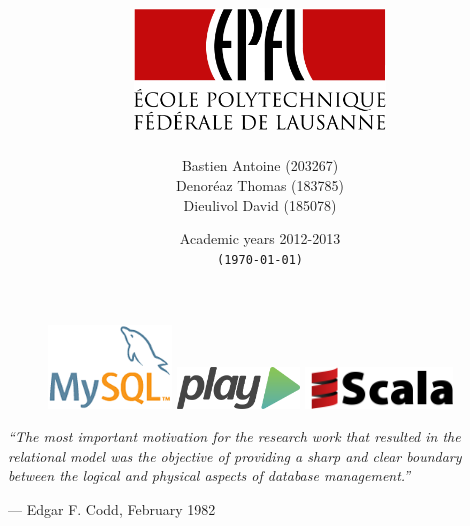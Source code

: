 \documentclass[a4paper,oneside,11pt]{report}  %
\title{{\huge \doctype}\\\vspace{1em}{\Huge \titre}\\\vspace{4em}\includegraphics[width=0.5\textwidth]{logo_epfl}}
\author{Bastien Antoine (203267)\\ Denoréaz Thomas (183785)\\ Dieulivol David (185078)}
\date{Academic years 2012-2013\\\texttt{(\today)}}
\newcommand{\insertblankpage}{\newpage\thispagestyle{empty}\mbox{}\newpage}
\begin{document}


\begin{figure}[b]
	\centering
	\includegraphics[height=6em]{logo_mysql}
	\hspace*{\fill}
	\includegraphics[height=3em]{logo_play}
	\hspace*{\fill}	
	\includegraphics[height=3em]{logo_scala}
\end{figure}

\newpage

\maketitle                                  %


\newpage

\thispagestyle{empty}
\vspace*{\fill}

\begin{center}
\parbox{0.73\textwidth}{
\large \emph{\textquotedblleft The most important motivation for the research work that resulted in the relational model was the objective of providing a sharp and clear boundary between the logical and physical aspects of database management.\textquotedblright }}
\parbox{0.65\textwidth}{\begin{flushright}---\hspace{0.5em} Edgar F. Codd, February 1982\end{flushright}}
\end{center}
\end{document}
